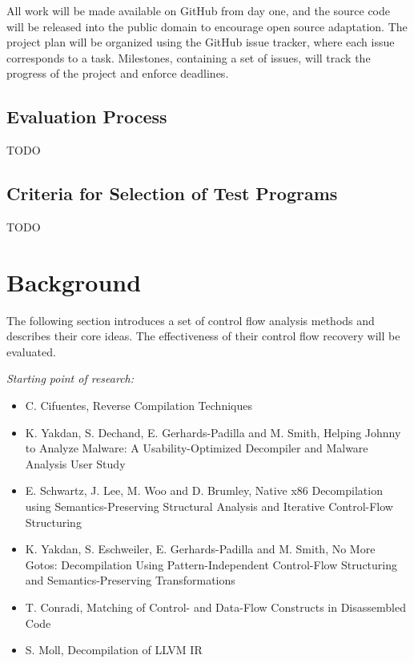 \documentclass[12pt, a4paper]{article}
\begin{document}
All work will be made available on GitHub from day one, and the source code will be released into the public domain to encourage open source adaptation. The project plan will be organized using the GitHub issue tracker, where each issue corresponds to a task. Milestones, containing a set of issues, will track the progress of the project and enforce deadlines.

\subsection{Evaluation Process}

TODO

\subsection{Criteria for Selection of Test Programs}

TODO

\section{Background}

The following section introduces a set of control flow analysis methods and describes their core ideas. The effectiveness of their control flow recovery will be evaluated.

\textit{Starting point of research:}

\begin{itemize}
	\item C. Cifuentes, Reverse Compilation Techniques \cite{cifuentes_reverse_comp}
	\item K. Yakdan, S. Dechand, E. Gerhards-Padilla and M. Smith, Helping Johnny to Analyze Malware: A Usability-Optimized Decompiler and Malware Analysis User Study \cite{helping_johnny}
	\item E. Schwartz, J. Lee, M. Woo and D. Brumley, Native x86 Decompilation using Semantics-Preserving Structural Analysis and Iterative Control-Flow Structuring \cite{semantics_preserving_structural_analysis}
	\item K. Yakdan, S. Eschweiler, E. Gerhards-Padilla and M. Smith, No More Gotos: Decompilation Using Pattern-Independent Control-Flow Structuring and Semantics-Preserving Transformations \cite{no_more_gotos}
	\item T. Conradi, Matching of Control- and Data-Flow Constructs in Disassembled Code \cite{pdg_control_flow_analysis}
	\item S. Moll, Decompilation of LLVM IR \cite{node_splitting}
\end{itemize}
\end{document}
